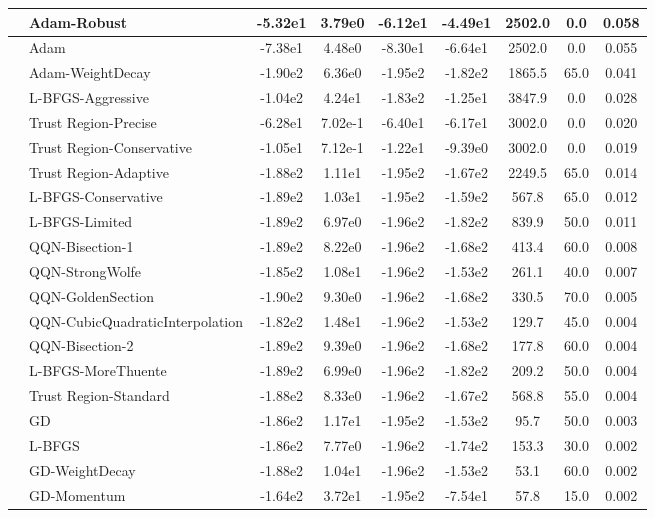 \documentclass[10pt]{article}
\begin{document}
\begin{longtable}{|l|l|c|c|c|c|c|c|c|}
\hline
 & Adam-Robust & -5.32e1 & 3.79e0 & -6.12e1 & -4.49e1 & 2502.0 & 0.0 & 0.058 \\
\hline
 & Adam & -7.38e1 & 4.48e0 & -8.30e1 & -6.64e1 & 2502.0 & 0.0 & 0.055 \\
\hline
 & Adam-WeightDecay & -1.90e2 & 6.36e0 & -1.95e2 & -1.82e2 & 1865.5 & 65.0 & 0.041 \\
\hline
 & L-BFGS-Aggressive & -1.04e2 & 4.24e1 & -1.83e2 & -1.25e1 & 3847.9 & 0.0 & 0.028 \\
\hline
 & Trust Region-Precise & -6.28e1 & 7.02e-1 & -6.40e1 & -6.17e1 & 3002.0 & 0.0 & 0.020 \\
\hline
 & Trust Region-Conservative & -1.05e1 & 7.12e-1 & -1.22e1 & -9.39e0 & 3002.0 & 0.0 & 0.019 \\
\hline
 & Trust Region-Adaptive & -1.88e2 & 1.11e1 & -1.95e2 & -1.67e2 & 2249.5 & 65.0 & 0.014 \\
\hline
 & L-BFGS-Conservative & -1.89e2 & 1.03e1 & -1.95e2 & -1.59e2 & 567.8 & 65.0 & 0.012 \\
\hline
 & L-BFGS-Limited & -1.89e2 & 6.97e0 & -1.96e2 & -1.82e2 & 839.9 & 50.0 & 0.011 \\
\hline
 & QQN-Bisection-1 & -1.89e2 & 8.22e0 & -1.96e2 & -1.68e2 & 413.4 & 60.0 & 0.008 \\
\hline
 & QQN-StrongWolfe & -1.85e2 & 1.08e1 & -1.96e2 & -1.53e2 & 261.1 & 40.0 & 0.007 \\
\hline
 & QQN-GoldenSection & -1.90e2 & 9.30e0 & -1.96e2 & -1.68e2 & 330.5 & 70.0 & 0.005 \\
\hline
 & QQN-CubicQuadraticInterpolation & -1.82e2 & 1.48e1 & -1.96e2 & -1.53e2 & 129.7 & 45.0 & 0.004 \\
\hline
 & QQN-Bisection-2 & -1.89e2 & 9.39e0 & -1.96e2 & -1.68e2 & 177.8 & 60.0 & 0.004 \\
\hline
 & L-BFGS-MoreThuente & -1.89e2 & 6.99e0 & -1.96e2 & -1.82e2 & 209.2 & 50.0 & 0.004 \\
\hline
 & Trust Region-Standard & -1.88e2 & 8.33e0 & -1.96e2 & -1.67e2 & 568.8 & 55.0 & 0.004 \\
\hline
 & GD & -1.86e2 & 1.17e1 & -1.95e2 & -1.53e2 & 95.7 & 50.0 & 0.003 \\
\hline
 & L-BFGS & -1.86e2 & 7.77e0 & -1.96e2 & -1.74e2 & 153.3 & 30.0 & 0.002 \\
\hline
 & GD-WeightDecay & -1.88e2 & 1.04e1 & -1.96e2 & -1.53e2 & 53.1 & 60.0 & 0.002 \\
\hline
 & GD-Momentum & -1.64e2 & 3.72e1 & -1.95e2 & -7.54e1 & 57.8 & 15.0 & 0.002 \\

\end{longtable}
\end{document}
